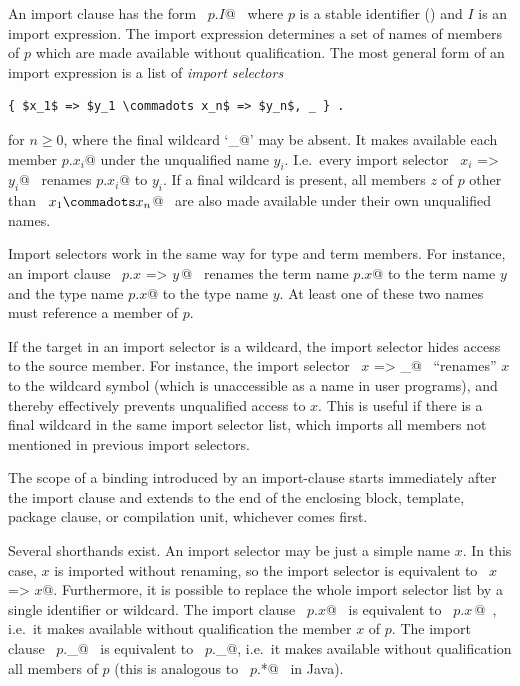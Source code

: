 An import clause has the form ~\lstinline@import $p$.$I$@~ where $p$ is a stable
identifier () and $I$ is an import expression.
The import expression determines a set of names of members of $p$
which are made available without qualification. 
The most general form of an import expression is a list of {\em import
selectors}
\begin{lstlisting}
{ $x_1$ => $y_1 \commadots x_n$ => $y_n$, _ } .
\end{lstlisting}
for $n \geq 0$, where the final wildcard `\lstinline@_@' may be absent.  It
makes available each member \lstinline@$p$.$x_i$@ under the unqualified name
$y_i$. I.e.\ every import selector ~\lstinline@$x_i$ => $y_i$@~ renames
\lstinline@$p$.$x_i$@ to
$y_i$.  If a final wildcard is present, all members $z$ of
$p$ other than ~\lstinline@$x_1 \commadots x_n$@~ are also made available
under their own unqualified names.

Import selectors work in the same way for type and term members. For
instance, an import clause ~\lstinline@import $p$.{$x$ => $y\,$}@~ renames the term
name \lstinline@$p$.$x$@ to the term name $y$ and the type name \lstinline@$p$.$x$@
to the type name $y$. At least one of these two names must
reference a member of $p$.

If the target in an import selector is a wildcard, the import selector
hides access to the source member. For instance, the import selector
~\lstinline@$x$ => _@~ ``renames'' $x$ to the wildcard symbol (which is
unaccessible as a name in user programs), and thereby effectively
prevents unqualified access to $x$. This is useful if there is a
final wildcard in the same import selector list, which imports all
members not mentioned in previous import selectors.

The scope of a binding introduced by an import-clause starts
immediately after the import clause and extends to the end of the
enclosing block, template, package clause, or compilation unit,
whichever comes first.

Several shorthands exist. An import selector may be just a simple name
$x$. In this case, $x$ is imported without renaming, so the
import selector is equivalent to ~\lstinline@$x$ => $x$@. Furthermore, it is
possible to replace the whole import selector list by a single
identifier or wildcard. The import clause ~\lstinline@import $p$.$x$@~ is
equivalent to ~\lstinline@import $p$.{$x\,$}@~, i.e.\ it makes available without
qualification the member $x$ of $p$. The import clause
~\lstinline@import $p$._@~ is equivalent to
~\lstinline@import $p$.{_}@, 
i.e.\ it makes available without qualification all members of $p$
(this is analogous to ~\lstinline@import $p$.*@~ in Java).


